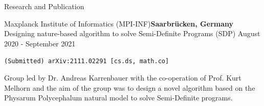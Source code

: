 \documentclass{resume} %
\begin{document}
\begin{rSection}{Research and Publication}
\begin{rSubsection}{Maxplanck Institute of Informatics (MPI-INF)}{\textcolor{Black!70}{\bf Saarbrücken, Germany}}
{Designing nature-based algorithm to solve Semi-Definite Programs (SDP)}
{\textcolor{Black!70}{August 2020 - September 2021}}
\item {\tt(Submitted) arXiv:2111.02291 [cs.ds, math.co]} \begin{small}
\item Group led by Dr. Andreas Karrenbauer with the co-operation of Prof. Kurt Melhorn and the aim of the group was to design a novel algorithm based on the Physarum Polycephalum natural model to solve Semi-Definite programs.
\end{small}
\end{rSubsection}

\end{rSection}



\end{document}
